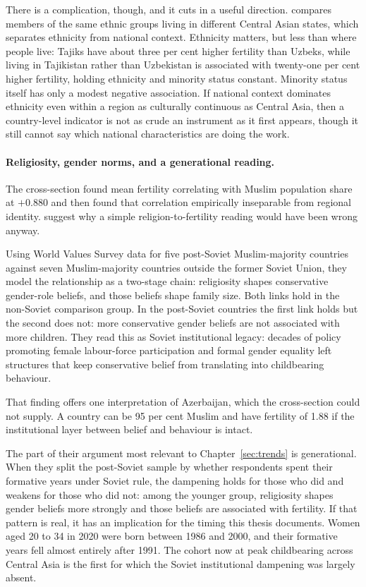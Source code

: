 There is a complication, though, and it cuts in a useful direction. \textcite{nedoluzhko2012} compares members of the same ethnic groups living in different Central Asian states, which separates ethnicity from national context. Ethnicity matters, but less than where people live: Tajiks have about three per cent higher fertility than Uzbeks, while living in Tajikistan rather than Uzbekistan is associated with twenty-one per cent higher fertility, holding ethnicity and minority status constant. Minority status itself has only a modest negative association. If national context dominates ethnicity even within a region as culturally continuous as Central Asia, then a country-level indicator is not as crude an instrument as it first appears, though it still cannot say which national characteristics are doing the work.

\paragraph{Religiosity, gender norms, and a generational reading.} The cross-section found mean fertility correlating with Muslim population share at $+0.880$ and then found that correlation empirically inseparable from regional identity. \textcite{kumo2024} suggest why a simple religion-to-fertility reading would have been wrong anyway.

Using World Values Survey data for five post-Soviet Muslim-majority countries against seven Muslim-majority countries outside the former Soviet Union, they model the relationship as a two-stage chain: religiosity shapes conservative gender-role beliefs, and those beliefs shape family size. Both links hold in the non-Soviet comparison group. In the post-Soviet countries the first link holds but the second does not: more conservative gender beliefs are not associated with more children. They read this as Soviet institutional legacy: decades of policy promoting female labour-force participation and formal gender equality left structures that keep conservative belief from translating into childbearing behaviour.

That finding offers one interpretation of Azerbaijan, which the cross-section could not supply. A country can be 95 per cent Muslim and have fertility of 1.88 if the institutional layer between belief and behaviour is intact.

The part of their argument most relevant to Chapter~\ref{sec:trends} is generational. When they split the post-Soviet sample by whether respondents spent their formative years under Soviet rule, the dampening holds for those who did and weakens for those who did not: among the younger group, religiosity shapes gender beliefs more strongly and those beliefs are associated with fertility. If that pattern is real, it has an implication for the timing this thesis documents. Women aged 20 to 34 in 2020 were born between 1986 and 2000, and their formative years fell almost entirely after 1991. The cohort now at peak childbearing across Central Asia is the first for which the Soviet institutional dampening was largely absent.

